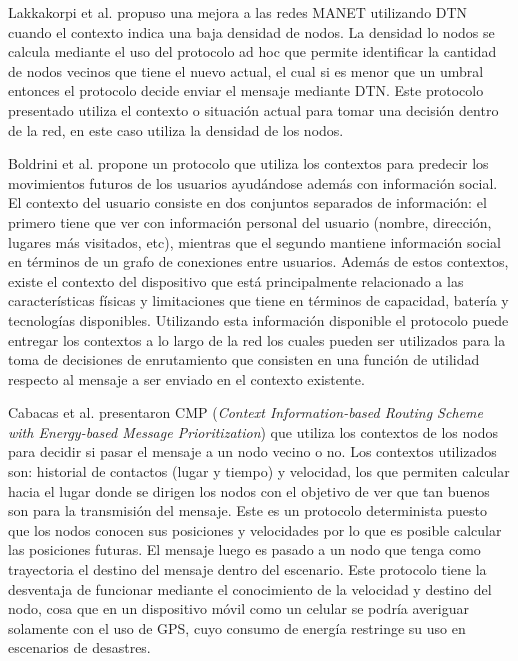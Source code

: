 Lakkakorpi et al. \cite{DBLP:conf/mswim/LakkakorpiPO10} propuso una mejora a
las redes MANET utilizando DTN cuando el contexto indica una baja densidad de
nodos. La densidad lo nodos se calcula mediante el uso del protocolo ad hoc
que permite identificar la cantidad de nodos vecinos que tiene el nuevo
actual, el cual si es menor que un umbral entonces el protocolo decide enviar
el mensaje mediante DTN. Este protocolo presentado utiliza el contexto o
situación actual para tomar una decisión dentro de la red, en este caso
utiliza la densidad de los nodos.

Boldrini et al. \cite{DBLP:journals/jnca/BoldriniCDP10} propone un protocolo
que utiliza los contextos para predecir los movimientos futuros de los usuarios
ayudándose además con información social. El contexto del usuario consiste en
dos conjuntos separados de información: el primero tiene que ver con información
personal del usuario (nombre, dirección, lugares más visitados, etc), mientras
que el segundo mantiene información social en términos de un grafo de conexiones
entre usuarios.  Además de estos contextos, existe el contexto del dispositivo
que está principalmente relacionado a las características físicas y limitaciones
que tiene en términos de capacidad, batería y tecnologías disponibles.
Utilizando esta información disponible el protocolo puede entregar los contextos
a lo largo de la red los cuales pueden ser utilizados para la toma de decisiones
de enrutamiento que consisten en una función de utilidad respecto al mensaje a
ser enviado en el contexto existente.


Cabacas et al. \cite{DBLP:journals/ijflis/CabacasR14} presentaron CMP
(\textit{Context Information-based Routing Scheme with Energy-based Message
Prioritization}) que utiliza los contextos de los nodos para decidir si pasar el
mensaje a un nodo vecino o no. Los contextos utilizados son: historial de
contactos (lugar y tiempo) y velocidad, los que permiten calcular hacia el lugar
donde se dirigen los nodos con el objetivo de ver que tan buenos son para la
transmisión del mensaje. Este es un protocolo determinista puesto que los nodos
conocen sus posiciones y velocidades por lo que es posible calcular las
posiciones futuras. El mensaje luego es pasado a un nodo que tenga como
trayectoria el destino del mensaje dentro del escenario. Este protocolo tiene la
desventaja de funcionar mediante el conocimiento de la velocidad y destino del
nodo, cosa que en un dispositivo móvil como un celular se podría averiguar
solamente con el uso de GPS, cuyo consumo de energía restringe su uso en
escenarios de desastres.



